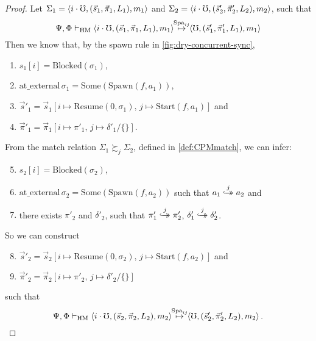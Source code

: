 \begin{proof} Let $\Sigma_1 = \left<i\cdot\mho, (\vec{s}_1, \vec{\pi}_1, L_1), m_1 \right>$ and $\Sigma_2 = \left<i\cdot\mho, (\vec{s}'_2, \vec{\pi}'_2, L_2), m_2 \right>$, 
such that
$$\Psi,\Phi \vdash_\mathrm{HM} 
\left<i\cdot\mho, (\vec{s}_1, \vec{\pi}_1, L_1), m_1 \right>
\!\!\stackrel{\mathrm{Spa}_{ij}}\mapsto\!\!
\left<\mho, (\vec{s}'_1, \vec{\pi}'_1, L_1), m_1 \right>$$
Then we know that, by the spawn rule in \cref{fig:dry-concurrent-sync}, 
\begin{enumerate}
\item $s_1[i]\!=\!\mathrm{Blocked}(\sigma_1) $,
\item $\mathrm{at\_external}\,\sigma_1=\mathrm{Some}(\mathrm{Spawn}(f\!,\!a_1))$,
\item $\vec{s}'_1 = \vec{s}_1[i\!\mapsto \!\mathrm{Resume}(0,\sigma_1),\, j \!\mapsto \!\mathrm{Start}(f\!,\!a_1)]$  and 
\item $\vec{\pi}'_1 = \vec{\pi}_1[i\mapsto \pi'_1,\,j \mapsto  \delta'_1/ \{\}]$.
\end{enumerate}

\noindent From the match relation $\Sigma_1 \succsim_{j} \Sigma_2$, defined in \cref{def:CPMmatch}, we can infer:
\begin{enumerate}
\setcounter{enumi}{4}
\item $s_2[i]\!=\!\mathrm{Blocked}(\sigma_2)$,
\item $\mathrm{at\_external}\,\sigma_2=\mathrm{Some}(\mathrm{Spawn}(f\!,\!a_2))$ such that $a_1 \overset{j}{\hookrightarrow\mathrel{\mspace{-15mu}}\rightarrow} a_2$ and
\item there exists $\pi'_2$ and $\delta'_2$, such that $\pi'_1 \overset{j}{\hookrightarrow\mathrel{\mspace{-15mu}}\rightarrow} \pi'_2$, $\delta'_1 \overset{j}{\hookrightarrow\mathrel{\mspace{-15mu}}\rightarrow} \delta'_2$.
\end{enumerate}
So we can construct 
\begin{enumerate}
\setcounter{enumi}{7}
\item $\vec{s}'_2 = \vec{s}_2[i\!\mapsto \!\mathrm{Resume}(0,\sigma_2),\, j \!\mapsto \!\mathrm{Start}(f\!,\!a_2)]$ and
\item $\vec{\pi}'_2 = \vec{\pi}_2[i\mapsto \pi'_2,\,j \mapsto  \delta'_2/ \{\}]$
\end{enumerate}
such that 
$$\Psi,\Phi \vdash_\mathrm{HM} 
\left<i\cdot\mho, (\vec{s}_2, \vec{\pi}_2, L_2), m_2 \right>
\!\!\stackrel{\mathrm{Spa}_{ij}}\mapsto\!\!
\left<\mho, (\vec{s}'_2, \vec{\pi}'_2, L_2), m_2 \right>.$$


\end{proof}
